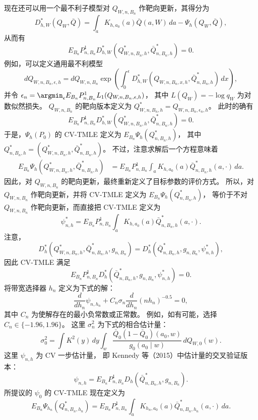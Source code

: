 现在还可以用一个最不利子模型对 $Q_{W,n,B_n}$ 作靶向更新，其得分为
\[
 D_{h,W}^*(Q_W,\bar Q)
 =\int_aK_{h,a_0}(a)\bar Q(a,W)\,da-\Psi_h(Q_W,\bar Q),
\]
从而有
\[
 E_{B_n}P^1_{n,B_n}
 D_{h,W}^*(Q^*_{W,n,B_n,h},\bar Q^*_{n,B_n,h})=0.
\]
例如，可以定义通用最不利模型
\[
 dQ_{W,n,B_n,\epsilon,h}=dQ_{W,n,B_n}
 \exp\left(\int_0^\epsilon
 D_{h,W}^*(Q_{W,n,B_n,x,h},\bar Q^*_{n,B_n,h})\,dx\right),
\]
并令
$\epsilon_n=\argmin_\epsilon E_{B_n}P^1_{n,B_n}L_1(Q_{W,n,B_n,\epsilon,h})$，
其中 $L(Q_W)=-\log q_W$ 为对数似然损失。
$Q_{W,n,B_n}$ 的靶向版本定义为
$Q^*_{W,n,B_n,h}=Q_{W,n,B_n,\epsilon_n,h}$。
此时的确有
\[
 E_{B_n}P^1_{n,B_n}
 D_{h,W}^*(Q^*_{W,n,B_n,h},\bar Q^*_{n,B_n,h})=0.
\]
于是，$\Psi_h(P_0)$ 的 CV-TMLE 定义为
$E_{B_n}\Psi_h(Q^*_{n,B_n,h})$，
其中 $Q^*_{n,B_n,h}=(Q^*_{W,n,B_n,h},\bar Q^*_{n,B_n,h})$。
不过，注意求解后一个方程意味着
\[
\begin{aligned}
 E_{B_n}\Psi_h(Q^*_{W,n,B_n,h},\bar Q^*_{n,B_n,h})
 &=E_{B_n}P^1_{n,B_n}\int_a
 K_{h,a_0}(a)\bar Q^*_{n,B_n,h}(a,\cdot)\,da.
\end{aligned}
\]
因此，对 $Q_{W,n,B_n}$ 的靶向更新，最终重新定义了目标参数的评价方式。
所以，对 $Q_{W,n,B_n}$ 作靶向更新，并将 CV-TMLE 定义为
$E_{B_n}\Psi_h(Q^*_{n,B_n,h})$，
等价于不对 $Q_{W,n,B_n}$ 作靶向更新，而直接把 CV-TMLE 定义为
\begin{equation}
 \psi^*_{n,h}=E_{B_n}P^1_{n,B_n}\int_a
 K_{h,a_0}(a)\bar Q^*_{n,B_n,h}(a,\cdot).
\tag{25.13}
\end{equation}
注意，
\[
 D_h^*(Q^*_{W,n,B_n,h},\bar Q^*_{n,B_n,h},g_{n,B_n})
 =D_h^*(\bar Q^*_{n,B_n,h},g_{n,B_n},\psi^*_{n,h}),
\]
因此 CV-TMLE 满足
\[
 E_{B_n}P^1_{n,B_n}
 D_h^*(\bar Q^*_{n,B_n,h},g_{n,B_n},\psi^*_{n,h})=0.
\]
将带宽选择器 $h_n$ 定义为下式的解：
\begin{equation}
 \frac{d}{dh_n}\psi_{n,h_n}
 +C_n\sigma_n\frac{d}{dh_n}(nh_n)^{-0.5}=0,
\tag{25.14}
\end{equation}
其中 $C_n$ 为使解存在的最小负常数或正常数。
例如，如有可能，选择 $C_n\in\{-1.96,1.96\}$。
这里 $\sigma_n^2$ 为下式的相合估计量：
\begin{equation}
 \sigma_0^2=\int K^2(y)\,dy\int_w
 \frac{\bar Q_0(1-\bar Q_0)(a_0,w)}{g_0(a_0\mid w)}\,dQ_{W,0}(w).
\tag{25.15}
\end{equation}
这里 $\psi_{n,h}$ 为 CV 一步估计量，
即 Kennedy 等（2015）中估计量的交叉验证版本：
\[
 \psi_{n,h}=E_{B_n}P^1_{n,B_n}
 D_h(\bar Q^*_{n,B_n,h},g_{n,B_n}).
\]
所提议的 $\psi_0$ 的 CV-TMLE 现在定义为
\[
 E_{B_n}\Psi_{h_n}(Q^*_{n,B_n,h_n})
 =E_{B_n}P^1_{n,B_n}\int_a
 K_{h_n,a_0}(a)\bar Q^*_{n,B_n,h_n}(a,\cdot)\,da.
\]

